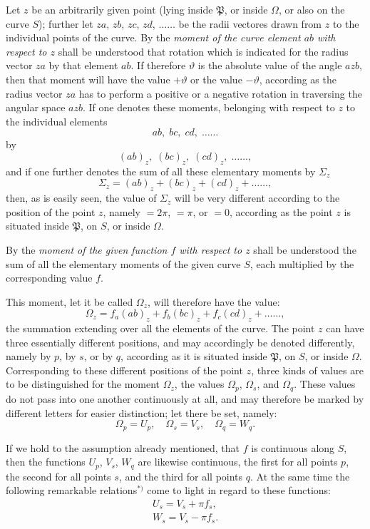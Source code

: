 \documentclass{article}
\begin{document}
Let $z$ be an arbitrarily given point (lying inside $\mathfrak{P}$, or inside $\Omega$, or also on the curve $S$); further let $za$, $zb$, $zc$, $zd$, $\ldots\ldots$ be the radii vectores drawn from $z$ to the individual points of the curve. By the \emph{moment of the curve element $ab$ with respect to $z$} shall be understood that rotation which is indicated for the radius vector $za$ by that element $ab$. If therefore $\vartheta$ is the absolute value of the angle $azb$, then that moment will have the value $+\vartheta$ or the value $-\vartheta$, according as the radius vector $za$ has to perform a positive or a negative rotation in traversing the angular space $azb$. If one denotes these moments, belonging with respect to $z$ to the individual elements
\[
ab,\; bc,\; cd,\; \ldots\ldots
\]
by
\[
(ab)_{z},\; (bc)_{z},\; (cd)_{z},\; \ldots\ldots,
\]
and if one further denotes the sum of all these elementary moments by $\Sigma_{z}$
\[
\Sigma_{z}=(ab)_{z}+(bc)_{z}+(cd)_{z}+\ldots\ldots,
\]
then, as is easily seen, the value of $\Sigma_{z}$ will be very different according to the position of the point $z$, namely $=2\pi$, $=\pi$, or $=0$, according as the point $z$ is situated inside $\mathfrak{P}$, on $S$, or inside $\Omega$.

By the \emph{moment of the given function $f$ with respect to $z$}
shall be understood the sum of all the elementary moments of the given curve $S$, each multiplied by the corresponding value $f$.

This moment, let it be called $\Omega_{z}$, will therefore have the value:
\[
\Omega_{z}=f_{a}(ab)_{z}+f_{b}(bc)_{z}+f_{c}(cd)_{z}+\ldots\ldots,
\]
the summation extending over all the elements of the curve. The point $z$ can have three essentially different positions, and may accordingly be denoted differently, namely by $p$, by $s$, or by $q$, according as it is situated inside $\mathfrak{P}$, on $S$, or inside $\Omega$. Corresponding to these different positions of the point $z$, three kinds of values are to be distinguished for the moment $\Omega_{z}$, the values $\Omega_{p}$, $\Omega_{s}$, and $\Omega_{q}$. These values do not pass into one another continuously at all, and may therefore be marked by different letters for easier distinction; let there be set, namely:
\[
\Omega_{p}=U_{p}, \quad \Omega_{s}=V_{s}, \quad \Omega_{q}=W_{q}.
\]

If we hold to the assumption already mentioned, that $f$ is continuous along $S$, then the functions $U_{p}$, $V_{s}$, $W_{q}$ are likewise continuous, the first for all points $p$, the second for all points $s$, and the third for all points $q$. At the same time the following remarkable relations${}^{*)}$ come to light in regard to these functions:
\[
\begin{gathered}
U_{s}=V_{s}+\pi f_{s},\\
W_{s}=V_{s}-\pi f_{s}.
\end{gathered}
\]
\end{document}
